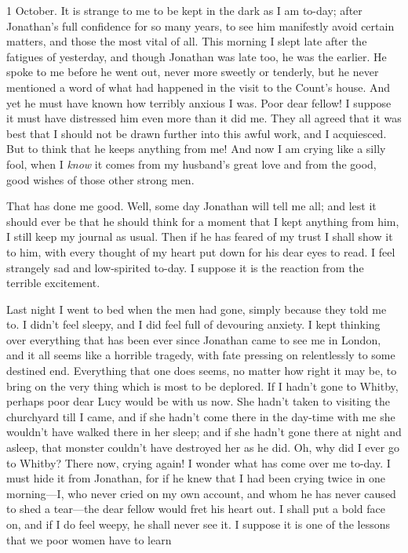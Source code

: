 \begin{diary}{1 October.}
It is strange to me to be kept in the dark as I am to-day; after Jonathan's full confidence for so many years, to see him manifestly avoid certain matters, and those the most vital of all. This morning I slept late after the fatigues of yesterday, and though Jonathan was late too, he was the earlier. He spoke to me before he went out, never more sweetly or tenderly, but he never mentioned a word of what had happened in the visit to the Count's house. And yet he must have known how terribly anxious I was. Poor dear fellow! I suppose it must have distressed him even more than it did me. They all agreed that it was best that I should not be drawn further into this awful work, and I acquiesced. But to think that he keeps anything from me! And now I am crying like a silly fool, when I \textit{know} it comes from my husband's great love and from the good, good wishes of those other strong men.

That has done me good. Well, some day Jonathan will tell me all; and lest it should ever be that he should think for a moment that I kept anything from him, I still keep my journal as usual. Then if he has feared of my trust I shall show it to him, with every thought of my heart put down for his dear eyes to read. I feel strangely sad and low-spirited to-day. I suppose it is the reaction from the terrible excitement.

Last night I went to bed when the men had gone, simply because they told me to. I didn't feel sleepy, and I did feel full of devouring anxiety. I kept thinking over everything that has been ever since Jonathan came to see me in London, and it all seems like a horrible tragedy, with fate pressing on relentlessly to some destined end. Everything that one does seems, no matter how right it may be, to bring on the very thing which is most to be deplored. If I hadn't gone to Whitby, perhaps poor dear Lucy would be with us now. She hadn't taken to visiting the churchyard till I came, and if she hadn't come there in the day-time with me she wouldn't have walked there in her sleep; and if she hadn't gone there at night and asleep, that monster couldn't have destroyed her as he did. Oh, why did I ever go to Whitby? There now, crying again! I wonder what has come over me to-day. I must hide it from Jonathan, for if he knew that I had been crying twice in one morning—I, who never cried on my own account, and whom he has never caused to shed a tear—the dear fellow would fret his heart out. I shall put a bold face on, and if I do feel weepy, he shall never see it. I suppose it is one of the lessons that we poor women have to learn


\end{diary}
